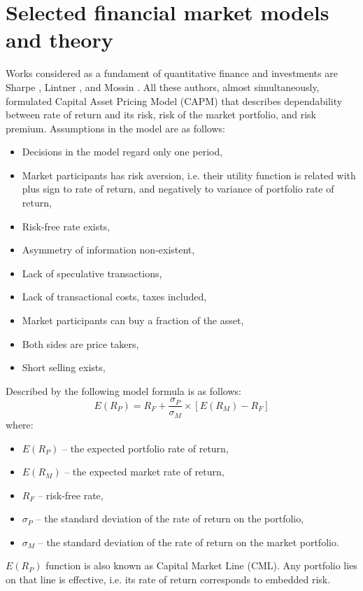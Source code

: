 \documentclass{pracamgr_wne}\usepackage[]{graphicx}\usepackage[]{color}
\begin{document}
\section{Selected financial market models and theory}


Works considered as a fundament of quantitative finance and investments are Sharpe \parencite{Sharpe1964}, Lintner \parencite{Lintner1965}, and Mossin \parencite{Mossin1966}. All these authors, almost simultaneously, formulated Capital Asset Pricing Model (CAPM) that describes dependability between rate of return and its risk, risk of the market portfolio, and risk premium.
Assumptions in the model are as follows:
\begin{itemize}
\item Decisions in the model regard only one period,
\item Market participants has risk aversion, i.e. their utility function is related with plus sign to rate of return, and negatively to variance of portfolio rate of return,
\item Risk-free rate exists,
\item Asymmetry of information non-existent,
\item Lack of speculative transactions,
\item Lack of transactional costs, taxes included,
\item Market participants can buy a fraction of the asset,
\item Both sides are price takers,
\item Short selling exists,
\end{itemize}
Described by the following model formula is as follows:
\begin{equation}
E(R_P)=R_F+\frac{\sigma_P}{\sigma_M}\times[E(R_M)-R_F]
\end{equation}
where:
\begin{itemize}
\item $E(R_P )$ -- the expected portfolio rate of return,
\item $E(R_M)$ -- the expected market rate of return,
\item $R_F$ -- risk-free rate,
\item $\sigma_P$ -- the standard deviation of the rate of return on the portfolio,
\item $\sigma_M$ -- the standard deviation of the rate of return on the market portfolio.
\end{itemize}
$E(R_P)$ function is also known as Capital Market Line (CML). Any portfolio lies on that line is effective, i.e. its rate of return corresponds to embedded risk.
\end{document}
